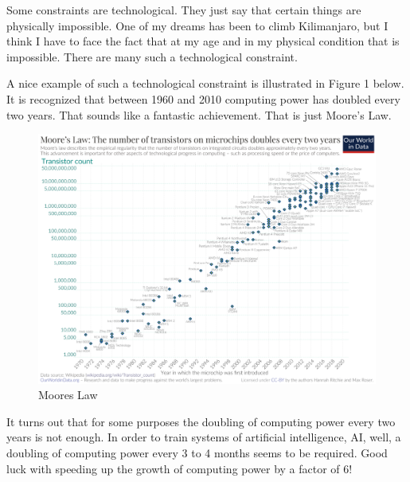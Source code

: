 \documentclass[
]{book}
\begin{document}
Some constraints are technological. They just say that certain things are physically impossible. One of my dreams has been to climb Kilimanjaro, but I think I have to face the fact that at my age and in my physical condition that is impossible. There are many such a technological constraint.

A nice example of such a technological constraint is illustrated in Figure 1 below. It is recognized that between 1960 and 2010 computing power has doubled every two years. That sounds like a fantastic achievement. That is just Moore's Law.

\begin{figure}

{\centering \includegraphics[width=1\linewidth]{img/rationalchoice/moore} 

}

\caption{Moores Law}\label{fig:rationalchoice1}
\end{figure}

It turns out that for some purposes the doubling of computing power every two years is not enough. In order to train systems of artificial intelligence, AI, well, a doubling of computing power every 3 to 4 months seems to be required. Good luck with speeding up the growth of computing power by a factor of 6!
\end{document}
